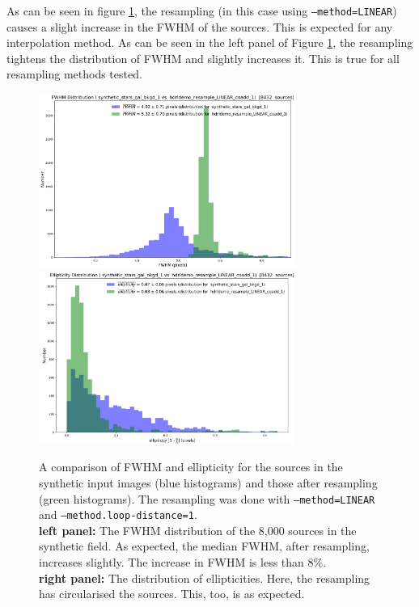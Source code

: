 As can be seen in figure \ref{fig:fwhm_ellip_synthetic}, the resampling (in this case using {\tt --method=LINEAR}) causes a slight increase in the FWHM of the sources.
This is expected for any interpolation method.   As can be seen in the left panel of Figure \ref{fig:fwhm_ellip_synthetic}, the resampling tightens the distribution of FWHM and
slightly increases it.   This is true for all resampling methods tested.   


\begin{figure}[H]
\centering
\includegraphics[width=8.4cm]{figures/match_field_LINEAR_coadd_1_FWHM_histogram.png}
\includegraphics[width=8.4cm]{figures/match_field_LINEAR_coadd_1_ellipticity_histogram.png} 
\caption[]
	{\footnotesize  A comparison of FWHM and ellipticity for the sources in the synthetic input images (blue histograms) and those
	after resampling (green histograms).  The resampling was done with {\tt --method=LINEAR} and {\tt --method.loop-distance=1}.\\
	{\bf left panel:}    The FWHM distribution of the 8,000 sources in the synthetic field. As expected, the median FWHM, after resampling, increases slightly.  
	                          The increase in FWHM is less than 8\%.\\
	{\bf right panel:} The distribution of ellipticities.   Here, the resampling has circularised the sources.   This, too, is as expected. 
	}
	\label{fig:fwhm_ellip_synthetic}
\end{figure}




